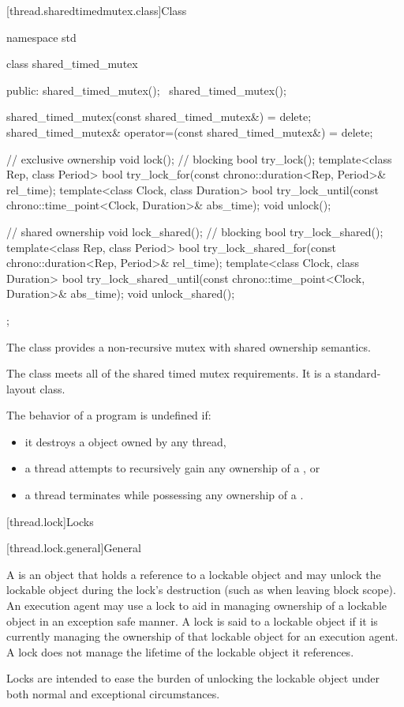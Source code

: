 [thread.sharedtimedmutex.class]{Class }

%
\begin{codeblock}
namespace std {
  class shared_timed_mutex {
  public:
    shared_timed_mutex();
    ~shared_timed_mutex();

    shared_timed_mutex(const shared_timed_mutex&) = delete;
    shared_timed_mutex& operator=(const shared_timed_mutex&) = delete;

    // exclusive ownership
    void lock();                // blocking
    bool try_lock();
    template<class Rep, class Period>
      bool try_lock_for(const chrono::duration<Rep, Period>& rel_time);
    template<class Clock, class Duration>
      bool try_lock_until(const chrono::time_point<Clock, Duration>& abs_time);
    void unlock();

    // shared ownership
    void lock_shared();         // blocking
    bool try_lock_shared();
    template<class Rep, class Period>
      bool try_lock_shared_for(const chrono::duration<Rep, Period>& rel_time);
    template<class Clock, class Duration>
      bool try_lock_shared_until(const chrono::time_point<Clock, Duration>& abs_time);
    void unlock_shared();
  };
}
\end{codeblock}

\pnum
The class  provides a non-recursive mutex with shared
ownership semantics.

\pnum
The class  meets
all of the shared timed mutex requirements.
It is a standard-layout class.

\pnum
The behavior of a program is undefined if:
\begin{itemize}
\item it destroys a  object owned by any thread,
\item a thread attempts to recursively gain any ownership of a , or
\item a thread terminates while possessing any ownership of a .
\end{itemize}

[thread.lock]{Locks}

[thread.lock.general]{General}

\pnum
A  is an object that holds a reference to a lockable object and may unlock the
lockable object during the lock's destruction (such as when leaving block scope). An execution
agent may use a lock to aid in managing ownership of a lockable object in an exception safe
manner. A lock is said to  a lockable object if it is currently managing the
ownership of that lockable object for an execution agent. A lock does not manage the lifetime
of the lockable object it references.
\begin{note}
Locks are intended to ease the burden of
unlocking the lockable object under both normal and exceptional circumstances.
\end{note}


